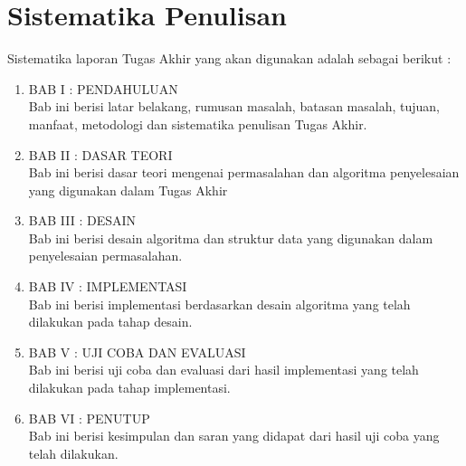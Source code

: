 \section { Sistematika Penulisan}
Sistematika laporan Tugas Akhir yang akan digunakan adalah sebagai berikut :
\begin{enumerate}
    \item BAB I : PENDAHULUAN\\
    Bab ini berisi latar belakang, rumusan masalah, batasan masalah, tujuan, manfaat, metodologi dan sistematika penulisan Tugas Akhir.
    \item BAB II : DASAR TEORI\\
    Bab ini berisi dasar teori mengenai permasalahan dan algoritma penyelesaian yang digunakan dalam Tugas Akhir
    \item BAB III : DESAIN\\
    Bab ini berisi desain algoritma dan struktur data yang digunakan dalam penyelesaian permasalahan.
    \item BAB IV : IMPLEMENTASI\\
    Bab ini berisi implementasi berdasarkan desain algoritma yang telah dilakukan pada tahap desain.
    \item BAB V : UJI COBA DAN EVALUASI\\
    Bab ini berisi uji coba dan evaluasi dari hasil implementasi yang telah dilakukan pada tahap implementasi.
    \item BAB VI : PENUTUP\\
    Bab ini berisi kesimpulan dan saran yang didapat dari hasil uji coba yang telah dilakukan.
\end{enumerate}